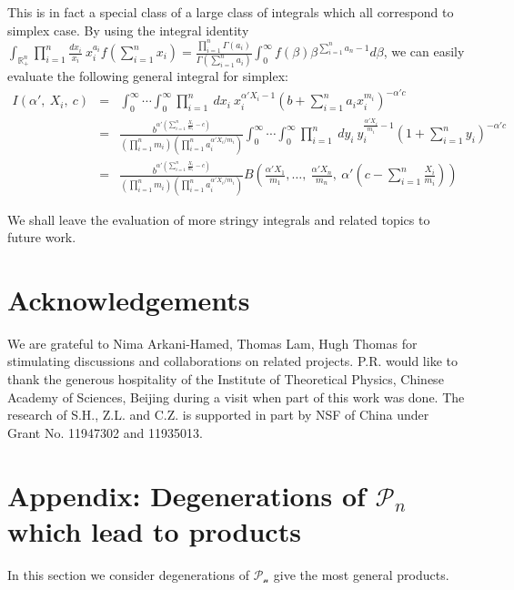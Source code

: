 \documentclass[hidelinks,12pt]{article}
\newcommand{\bea}[1]{\begin{eqnarray}\label{#1} }
\newcommand{\eea}{\end{eqnarray}}
\def\bea{\begin{eqnarray}}
\def\eea{\end{eqnarray}}
\begin{document}
This is in fact a special class of a large class of integrals which all correspond to simplex case. By using the integral identity $\int_{{\mathbb R_{+}^{n}}} \prod_{i=1}^{n} \frac{d x_i }{x_i}~x_i^{a_i}  f\left(\sum_{i=1}^{n} x_i \right)   = \frac{\prod_{i=1}^n \Gamma{(a_i)}}{\Gamma{(\sum_{i=1}^n a_i)}} \int_{0}^{\infty} f(\beta) \beta^{\sum_{i=1}^{n} a_n -1} d\beta$, we can easily evaluate the following general integral for simplex:
\bea
I(\alpha',~X_i,~c ) &=&  \int_{0}^{\infty} \cdots \int_{0}^{\infty} \prod_{i=1}^{n} ~dx_i ~x_i^{\alpha' X_i -1}  \left( b+\sum_{i=1}^n a_i x_i^{m_i} \right)^{-\alpha' c } \nonumber  \\
&=& \frac{b^{\alpha' \left(\sum_{i=1}^n \frac{X_i}{m_i}-c \right) }}{(\prod_{i=1}^n m_i) (\prod_{i=1}^n a_i^{\alpha' X_i /m_i})} \int_{0}^{\infty} \cdots \int_{0}^{\infty} \prod_{i=1}^{n} ~dy_i ~y_i^{ \frac{\alpha' X_i}{m_i} -1}  \left( 1+\sum_{i=1}^n y_i \right)^{-\alpha' c } \nonumber  \\
&=&\frac{b^{\alpha' \left(\sum_{i=1}^n \frac{X_i}{m_i}-c \right) }}{(\prod_{i=1}^n m_i) (\prod_{i=1}^n a_i^{\alpha' X_i /m_i})} B\left(\frac{ \alpha' X_1}{m_1},\dots,~\frac{ \alpha' X_n}{m_n}, ~ \alpha' \left(c- \sum_{i=1}^n \frac{X_i}{m_i} \right) \right) \nonumber \eea

We shall leave the evaluation of more stringy integrals and related topics to future work.


\section*{ Acknowledgements}
We are grateful to Nima Arkani-Hamed, Thomas Lam, Hugh Thomas for stimulating discussions and collaborations on related projects. P.R. would like to thank the generous hospitality of the Institute of Theoretical Physics, Chinese Academy of Sciences, Beijing during a visit when part of this work was done. The research of S.H., Z.L. and C.Z. is supported in part by NSF of China under Grant No. 11947302 and 11935013. 

\appendix 

\section{Appendix: Degenerations of ${\mathscr P_n}$ which lead to products}\label{appendix:A}
In this section we consider degenerations of $\mathscr{P_n}$ give the most general products. 
\end{document}
